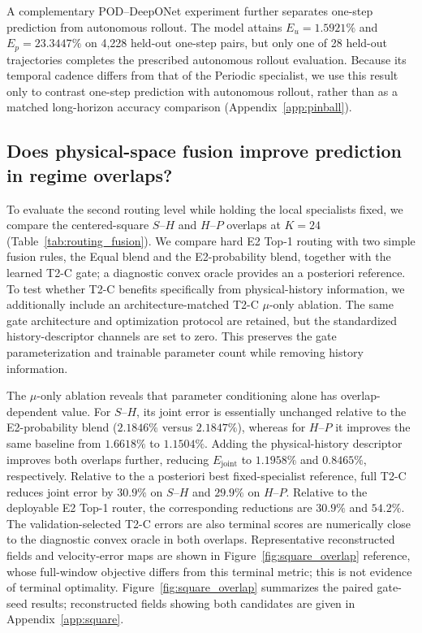 \documentclass{article}
\providecommand{\DIFaddtex}[1]{{\protect\color{blue} \sf #1}} %
\providecommand{\DIFdeltex}[1]{{\protect\color{red} \scriptsize #1}} %
\providecommand{\DIFaddbegin}{} %
\providecommand{\DIFaddend}{} %
\providecommand{\DIFdelbegin}{} %
\providecommand{\DIFdelend}{} %
\providecommand{\DIFadd}[1]{\texorpdfstring{\DIFaddtex{#1}}{#1}} %
\providecommand{\DIFdel}[1]{\texorpdfstring{\DIFdeltex{#1}}{}} %
\begin{document}
\par

A complementary POD--DeepONet experiment further separates one-step prediction from autonomous rollout.
The model attains $E_u=1.5921\%$ and $E_p=23.3447\%$ on 4,228 held-out one-step pairs, but only one of 28 held-out trajectories completes the prescribed autonomous rollout evaluation. Because its temporal cadence differs from that of the Periodic specialist, we use this result only to contrast one-step prediction with autonomous rollout, rather than as a matched long-horizon accuracy comparison (Appendix~\ref{app:pinball}).





\subsection{Does physical-space fusion improve prediction in regime overlaps?}
To evaluate the second routing level while holding the local specialists fixed, we compare the centered-square $S$--$H$ and $H$--$P$ overlaps at $K=24$ (Table~\ref{tab:routing_fusion}). We compare hard E2 Top-1 routing with two simple fusion rules, the Equal blend and the E2-probability blend, together with the learned T2-C gate; a diagnostic convex oracle provides an a posteriori reference. To test whether T2-C benefits specifically from physical-history information, we additionally include an architecture-matched T2-C $\mu$-only ablation. The same gate architecture and optimization protocol are retained, but the standardized history-descriptor channels are set to zero. This preserves the gate parameterization and trainable parameter count while removing history information.


The $\mu$-only ablation reveals that parameter conditioning alone has overlap-dependent value. For $S$--$H$, its joint error is essentially unchanged relative to the E2-probability blend ($2.1846\%$ versus $2.1847\%$), whereas for $H$--$P$ it improves the same baseline from $1.6618\%$ to $1.1504\%$. Adding the physical-history descriptor improves both overlaps further, reducing $E_{\mathrm{joint}}$ to $1.1958\%$ and $0.8465\%$, respectively. Relative to the a posteriori best fixed-specialist reference, full T2-C reduces joint error by $30.9\%$ on $S$--$H$ and $29.9\%$ on $H$--$P$. Relative to the deployable E2 Top-1 router, the corresponding reductions are $30.9\%$ and $54.2\%$. The \DIFdelbegin \DIFdel{validation-selected T2-C errors are also }\DIFdelend \DIFaddbegin \DIFadd{terminal scores are numerically }\DIFaddend close to the diagnostic convex \DIFdelbegin \DIFdel{oracle in both overlaps. Representative reconstructed fields and velocity-error maps are shown in Figure~\ref{fig:square_overlap}}\DIFdelend \DIFaddbegin \DIFadd{reference, whose full-window objective differs from this terminal metric; this is not evidence of terminal optimality. Figure~\ref{fig:square_overlap} summarizes the paired gate-seed results; reconstructed fields showing both candidates are given in Appendix~\ref{app:square}}\DIFaddend .
\end{document}

